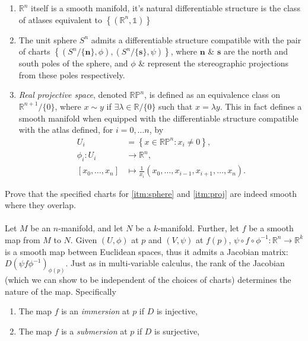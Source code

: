 \documentclass[fleqn, 11pt]{report}
\begin{document}
\begin{example}
\hfill
	\begin{enumerate}\vspace{-1cm}
		\setcounter{enumi}{-1}
		\item $ \mathbb{R}^n $ itself is a smooth manifold, it's natural differentiable structure is the class of atlases equivalent to $ \left\{ \left( \mathbb{R}^n, \mathds{1} \right) \right\} $
		\item\label{itm:sphere} The unit sphere $ S^n $ admits a differentiable structure compatible with the pair of charts $ \left\{ \left( S^n/\{\mathbf{n}\} , \phi \right), \left( S^n/\{\mathbf{s}\} , \psi \right) \right\} $, where $ \mathbf{n} $ \& $ \mathbf{s} $ are the north and south poles of the sphere, and $ \phi $ \& represent the stereographic projections from these poles respectively.
		\item\label{itm:proj} \textsl{Real projective space}, denoted $ \mathbb{RP}^n $, is defined as an equivalence class on $ \mathbb{R}^{n+1}/\{0\} $, where $ x \sim y $ if $ \exists \lambda \in \mathbb{R}/\{0\} $ such that $ x = \lambda y $. This in fact defines a smooth manifold when equipped with the differentiable structure compatible with the atlas defined, for $ {i = 0, \ldots n} $, by
			\begin{align*}\label{key}
				U_i &= \left\{ x \in \mathbb{RP}^n : x_i \neq 0 \right\},\\
				\phi_i: U_i &\to \mathbb{R}^n, \\
				\left[x_0, \ldots, x_{n} \right] &\mapsto \tfrac{1}{x_i}\left(x_0, \ldots, x_{i-1}, x_{i+1}, \ldots, x_{n} \right).
			\end{align*}
	\end{enumerate}
\end{example}
\begin{exercise}
	Prove that the specified charts for \ref{itm:sphere} and \ref{itm:proj} are indeed smooth where they overlap.
\end{exercise}

\paragraph{}
Let $ M $ be an $ n $-manifold, and let $ N $ be a $ k $-manifold. Further, let $ f $ be a smooth map from $ M $ to $ N $. Given $ (U, \phi) $ at $ p $ and $ (V, \psi) $ at $ f(p) $, $ \psi \circ f \circ \phi^{-1}: \mathbb{R}^n \to \mathbb{R}^k $ is a smooth map between Euclidean spaces, thus it admits a Jacobian matrix: $ D( \psi f \phi^{-1} )_{\phi(p)} $. Just as in multi-variable calculus, the rank of the Jacobian (which we can show to be independent of the choices of charts) determines the nature of the map. Specifically
\begin{enumerate}
	\item The map $ f $ is an \textsl{immersion} at $ p $ if $ D $ is injective,
	\item The map $ f $ is a \textsl{submersion} at $ p $ if $ D $ is surjective,
\end{enumerate}
\end{document}
